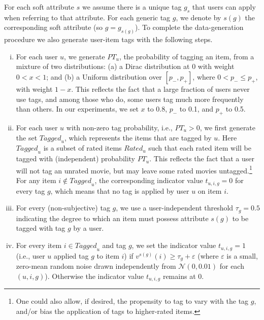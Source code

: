 \documentclass[manuscript,screen,nonacm]{acmart}
\newcommand{\1}{{\mathbf 1}}
\newcommand{\calN}{\mathcal{N}}
\newcommand{\veps}{\varepsilon}
\newcommand{\Rated}{\mathit{Rated}}
\newcommand{\Tagged}{\mathit{Tagged}}
\newcommand{\PT}{\mathit{PT}}
\theoremstyle{TheoremNum}
\begin{document}
For each soft attribute $s$ we assume there is a unique tag $g_s$ that users can apply when referring to that attribute. For each generic tag $g$, we denote by $s(g)$ the corresponding soft attribute (so $g = g_{s(g)}$). To complete the data-generation procedure we also generate user-item tags with the following steps. 
\begin{enumerate}[(i)]
\item For each user $u$, we generate $\PT_u$, the probability of tagging an item, from a mixture of two distributions: (a) a Dirac distribution at $0$ with weight $0<x<1$; and (b) a Uniform distribution
over $[p_-, p_+]$, where $0 < p_- \leq p_+$, with weight $1-x$. This reflects the fact that a large fraction of users never use tags, and among those who do, some users tag much more frequently than others. In our experiments, we set $x$ to 0.8, $p_-$ to 0.1, and $p_+$ to 0.5.

\item For each user $u$ with non-zero tag probability, i.e., $\PT_u > 0$, we first generate the set $\Tagged_u$, which represents the items that are tagged by $u$. Here $\Tagged_u$ is a subset of rated items $\Rated_u$ such that each rated item will be tagged with (independent) probability $\PT_u$. This reflects the fact that a user will not tag an unrated movie, but may leave some rated movies untagged.\footnote{One could also allow, if desired, the propensity to tag to vary with the tag $g$, and/or bias the application of tags to higher-rated items.} For any item $i\not\in\Tagged_u$, the corresponding indicator value $t_{u,i,g} = 0$ for every tag $g$, which means that no tag is applied by user $u$ on item $i$.

\item For every (non-subjective) tag $g$, we use a user-independent threshold $\tau_g = 0.5$ indicating the degree to which an item must possess attribute $s(g)$ to be tagged with tag $g$ by a user. 

\item For every item $i \in\Tagged_u$ and tag $g$, we set the indicator value $t_{u,i,g} = 1$ (i.e., user $u$ applied tag $g$ to item $i$) if $v^{s(g)}(i) \geq \tau_g + \veps$ (where $\veps$ is a small, zero-mean random noise drawn independently from $\calN(0, 0.01)$ for each $(u,i,g)$). Otherwise the indicator value $t_{u,i,g}$ remains at $0$. 

\end{enumerate}
\end{document}
